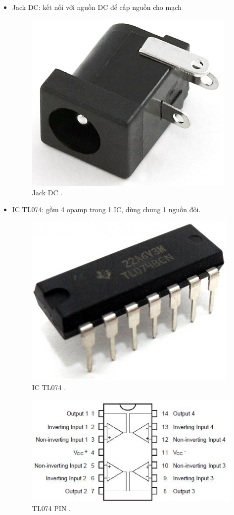 \documentclass[a4paper,12pt,oneside]{article}
\begin{document}
\begin{enumerate}
\begin{itemize}
\item	Jack DC: kết nối với nguồn DC để cấp nguồn cho mạch
\begin{figure}[H]
\centering
\includegraphics[scale=.5]{hinh/PPM/ppm_jackdc.jpg}
\caption{Jack DC \cite{dientuachau}.}
\end{figure}

\item	IC TL074: gồm 4 opamp trong 1 IC, dùng chung 1 nguồn đôi.
\begin{figure}[H]
\centering
\includegraphics[scale=.5]{hinh/PPM/ppm_tl074.jpg}
\caption{IC TL074 \cite{dientuachau}.}
\end{figure}

\begin{figure}[H]
\centering
\includegraphics[scale=1]{hinh/PPM/ppm_tl074_pin.jpg}
\caption{TL074 PIN \cite{tl074}.}
\end{figure}


\end{itemize}
\end{enumerate}
\end{document}
